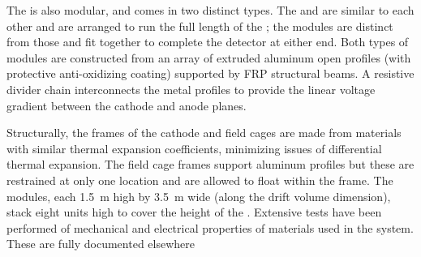 
The  is also modular, and comes in two distinct types. The  and  are similar to each other and are arranged to run the full length of the ; the  modules are distinct from those and fit together to complete the detector at either end. Both types of  modules are constructed from an array of extruded aluminum open profiles (with protective anti-oxidizing coating) supported by FRP %
structural beams. A resistive divider chain interconnects  the metal profiles to provide the linear voltage gradient between the cathode and anode planes.  

Structurally, the frames of the cathode and field cages are made from materials with similar thermal expansion coefficients, minimizing issues of differential thermal expansion. The field cage frames support aluminum profiles but these are restrained at only one location and are allowed to float within the frame.
The  modules, each \SI{1.5}{\m} high by \SI{3.5}{\m} wide (along the drift volume dimension), stack eight units high to cover the \tpcheight{} height of the .  
Extensive tests have been performed of mechanical and electrical properties of materials used in the  system.  These are fully documented elsewhere

